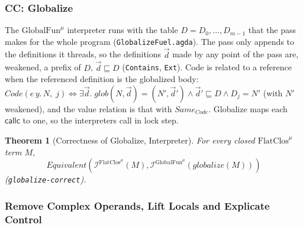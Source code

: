 \documentclass[10pt]{article}
\theoremstyle{acmplain}
\newtheorem{theorem}{Theorem}[section]
\newcommand{\key}[1]{\mathsf{#1}}
\newcommand{\pass}[1]{\mathit{#1}}
\newcommand{\Equiv}{\mathit{Equivalent}}
\newcommand{\Interp}[1]{\mathcal{I}^{#1}}
\newcommand{\Same}{\mathit{Same}}
\newcommand{\Ml}[1]{\textrm{#1}^{\mu}}                  %
\begin{document}
\subsubsection{CC: Globalize}

The $\Ml{GlobalFun}$ interpreter runs with the table $D = D_0, \ldots, D_{m-1}$
that the pass makes for the whole program (\texttt{GlobalizeFuel.agda}).
The pass only appends to the definitions it threads, so the definitions
$\vec{d}$ made by any point of the pass are, weakened, a prefix of $D$,
$\vec{d} \sqsubseteq D$ (\texttt{Contains}, \texttt{Ext}). Code is related
to a reference when the referenced definition is the globalized body:
$\mathit{Code}(e\, y.\, N,\; j) \iff \exists \vec{d}.\; \pass{glob}(N,
\vec{d}) = (N', \vec{d}') \land \vec{d}' \sqsubseteq D \land D_j = N'$ (with
$N'$ weakened), and the value relation is that with $\Same_{\mathit{Code}}$.
Globalize maps each $\key{callc}$ to one, so the interpreters call in lock
step.
\begin{theorem}[Correctness of Globalize, Interpreter]\label{thm:m-interp-globalize}
For every closed $\Ml{FlatClos}$ term $M$,
\[ \Equiv(\Interp{\Ml{FlatClos}}(M), \Interp{\Ml{GlobalFun}}(\pass{globalize}(M))) \]
(\texttt{globalize-correct}).
\end{theorem}

\subsubsection{Remove Complex Operands, Lift Locals and Explicate Control}
\end{document}
